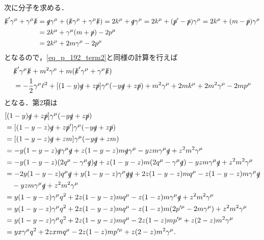 次に分子を求める．
\begin{align}
  \begin{split}
    \slashed{k}' \gamma^\mu + \gamma^\mu \slashed{k} &= \slashed{q} \gamma^\mu + (\slashed{k} \gamma^\mu + \gamma^\mu \slashed{k})
    = 2k^\mu + \slashed{q} \gamma^\mu = 2k^\mu + (\slashed{p}' - \slashed{p}) \gamma^\mu = 2k^\mu + (m - \slashed{p}) \gamma^\mu \\
    &= 2k^\mu + \gamma^\mu (m + \slashed{p}) - 2p^\mu \\
    &= 2k^\mu + 2m \gamma^\mu - 2p^\mu
  \end{split}
  \label{prob6_3_eq1}
\end{align}
となるので，\eqref{eq_p_192_term2}と同様の計算を行えば
\begin{align*}
  & \slashed{k}' \gamma^\mu \slashed{k} + m^2\gamma^\mu + m(\slashed{k}' \gamma^\mu + \gamma^\mu \slashed{k}) \\
  &= -\frac{1}{2} \gamma^\mu \ell^2 + [(1-y)\slashed{q} + z\slashed{p}] \gamma^\mu (-y\slashed{q}+z\slashed{p}) + m^2 \gamma^\mu + 2mk^\mu + 2m^2 \gamma^\mu - 2mp^\mu
\end{align*}
となる．第2項は
\begin{align*}
  & [(1-y)\slashed{q} + z\slashed{p}] \gamma^\mu (-y\slashed{q}+z\slashed{p}) \\
  &= [(1-y-z)\slashed{q} + z\slashed{p}'] \gamma^\mu (-y\slashed{q}+z\slashed{p}) \\
  &= [(1-y-z)\slashed{q} + zm] \gamma^\mu (-y\slashed{q}+zm) \\
  &= -y(1-y-z) \slashed{q} \gamma^\mu \slashed{q} + z(1-y-z) m \slashed{q} \gamma^\mu
  - yz m \gamma^\mu \slashed{q} + z^2m^2 \gamma^\mu \\
  &= -y(1-y-z) (2q^\mu - \gamma^\mu \slashed{q}) \slashed{q} + z(1-y-z) m (2q^\mu - \gamma^\mu \slashed{q})
  - yz m \gamma^\mu \slashed{q} + z^2m^2 \gamma^\mu \\
  &= -2y(1-y-z) q^\mu\slashed{q} + y(1-y-z) \gamma^\mu \slashed{q} \slashed{q} + 2z(1-y-z) m q^\mu - z(1-y-z) m \gamma^\mu \slashed{q} \\
  & \quad  - yz m \gamma^\mu \slashed{q} + z^2m^2 \gamma^\mu \\
  &= y(1-y-z) \gamma^\mu q^2 + 2z(1-y-z) m q^\mu - z(1-z) m \gamma^\mu \slashed{q} + z^2m^2 \gamma^\mu \\
  &= y(1-y-z) \gamma^\mu q^2 + 2z(1-y-z) m q^\mu - z(1-z) m (2p'^\mu - 2m\gamma^\mu) + z^2m^2 \gamma^\mu \\
  &= y(1-y-z) \gamma^\mu q^2 + 2z(1-y-z) m q^\mu - 2z(1-z) m p'^\mu + z(2-z)m^2 \gamma^\mu \\
  &= yx \gamma^\mu q^2 + 2zx m q^\mu - 2z(1-z) m p'^\mu + z(2-z)m^2 \gamma^\mu .
\end{align*}
